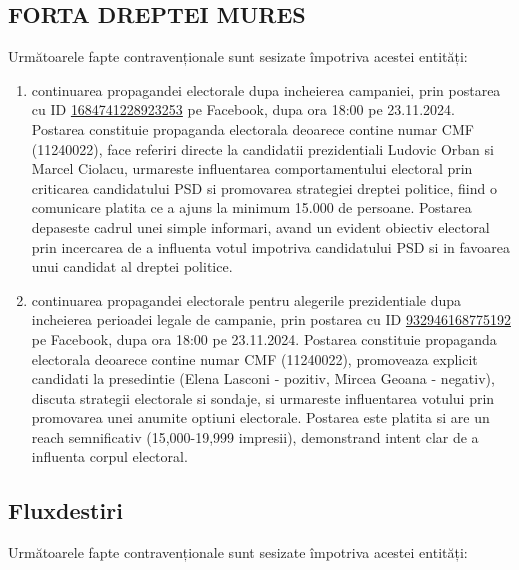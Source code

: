 \documentclass[a4paper,12pt]{article}
\begin{document}
\vspace{0.5cm}

\subsection{FORTA DREPTEI MURES}
Următoarele fapte contravenționale sunt sesizate împotriva acestei entități:

\begin{enumerate}[leftmargin=*, label=\arabic*.)]
    \item continuarea propagandei electorale dupa incheierea campaniei, prin postarea cu ID \href{https://www.facebook.com/ads/library/?id=1684741228923253}{1684741228923253} pe Facebook, dupa ora 18:00 pe 23.11.2024. Postarea constituie propaganda electorala deoarece contine numar CMF (11240022), face referiri directe la candidatii prezidentiali Ludovic Orban si Marcel Ciolacu, urmareste influentarea comportamentului electoral prin criticarea candidatului PSD si promovarea strategiei dreptei politice, fiind o comunicare platita ce a ajuns la minimum 15.000 de persoane. Postarea depaseste cadrul unei simple informari, avand un evident obiectiv electoral prin incercarea de a influenta votul impotriva candidatului PSD si in favoarea unui candidat al dreptei politice.
    \item continuarea propagandei electorale pentru alegerile prezidentiale dupa incheierea perioadei legale de campanie, prin postarea cu ID \href{https://www.facebook.com/ads/library/?id=932946168775192}{932946168775192} pe Facebook, dupa ora 18:00 pe 23.11.2024. Postarea constituie propaganda electorala deoarece contine numar CMF (11240022), promoveaza explicit candidati la presedintie (Elena Lasconi - pozitiv, Mircea Geoana - negativ), discuta strategii electorale si sondaje, si urmareste influentarea votului prin promovarea unei anumite optiuni electorale. Postarea este platita si are un reach semnificativ (15,000-19,999 impresii), demonstrand intent clar de a influenta corpul electoral.
\end{enumerate}

\vspace{0.5cm}

\subsection{Fluxdestiri}
Următoarele fapte contravenționale sunt sesizate împotriva acestei entități:
\end{document}
